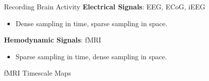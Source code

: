 \documentclass[12pt]{beamer}
\begin{document}
\begin{frame}{Recording Brain Activity}
\footnotesize
\vspace{0.25cm}
\textbf{Electrical Signals}: EEG, ECoG, iEEG
\begin{itemize}
    \item Dense sampling in time, sparse sampling in space.
\end{itemize}


\textbf{Hemodynamic Signals}: fMRI
\begin{itemize}
    \item Sparse sampling in time, dense sampling in space.
\end{itemize}
\end{frame}

\begin{frame}{fMRI Timescale Maps}
\centering
{}
\scriptsize
\cite{raut_hierarchical_2020, lurie_cortical_2024, shafiei_topographic_2020, mitra_lag_2014, kaneoke_variance_2012}
\end{frame}
\end{document}
